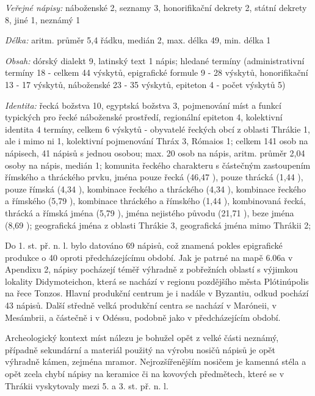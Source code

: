 {\em Veřejné nápisy:} náboženské 2, seznamy 3, honorifikační dekrety 2, státní dekrety 8, jiné 1, neznámý 1

{\em Délka:} aritm. průměr 5,4 řádku, medián 2, max. délka 49, min. délka 1

{\em Obsah:} dórský dialekt 9, latinský text 1 nápis; hledané termíny (administrativní termíny 18 - celkem 44 výskytů, epigrafické formule 9 - 28 výskytů, honorifikační 13 - 17 výskytů, náboženské 23 - 35 výskytů, epiteton 4 - počet výskytů 5)

{\em Identita:} řecká božstva 10, egyptská božstva 3, pojmenování míst a funkcí typických pro řecké náboženské prostředí, regionální epiteton 4, kolektivní identita 4 termíny, celkem 6 výskytů - obyvatelé řeckých obcí z oblasti Thrákie 1, ale i mimo ni 1, kolektivní pojmenování Thráx 3, Rómaios 1; celkem 141 osob na nápisech, 41 nápisů s jednou osobou; max. 20 osob na nápis, aritm. průměr 2,04 osoby na nápis, medián 1; komunita řeckého charakteru s částečným zastoupením římského a thráckého prvku, jména pouze řecká (46,47 ), pouze thrácká (1,44 ), pouze římská (4,34 ), kombinace řeckého a thráckého (4,34 ), kombinace řeckého a římského (5,79 ), kombinace thráckého a římského (1,44 ), kombinovaná řecká, thrácká a římská jména (5,79 ), jména nejistého původu (21,71 ), beze jména (8,69 ); geografická jména z oblasti Thrákie 3, geografická jména mimo Thrákii 2;

\NC\AR
\HL
\HL
\stoptable

Do 1. st. př. n. l. bylo datováno 69 nápisů, což znamená pokles epigrafické produkce o 40  oproti předcházejícímu období. Jak je patrné na mapě 6.06a v Apendixu 2, nápisy pocházejí téměř výhradně z pobřežních oblastí s výjimkou lokality Didymoteichon, která se nachází v regionu pozdějšího města Plótinúpolis na řece Tonzos. Hlavní produkční centrum je i nadále v Byzantiu, odkud pochází 43  nápisů. Další středně velká produkční centra se nachází v Maróneii, v Mesámbrii, a částečně i v Odéssu, podobně jako v předcházejícím období.

Archeologický kontext míst nálezu je bohužel opět z velké části neznámý, případně sekundární a materiál použitý na výrobu nosičů nápisů je opět výhradně kámen, zejména mramor. Nejrozšířenějším nosičem je kamenná stéla a opět zcela chybí nápisy na keramice či na kovových předmětech, které se v Thrákii vyskytovaly mezi 5. a 3. st. př. n. l.

